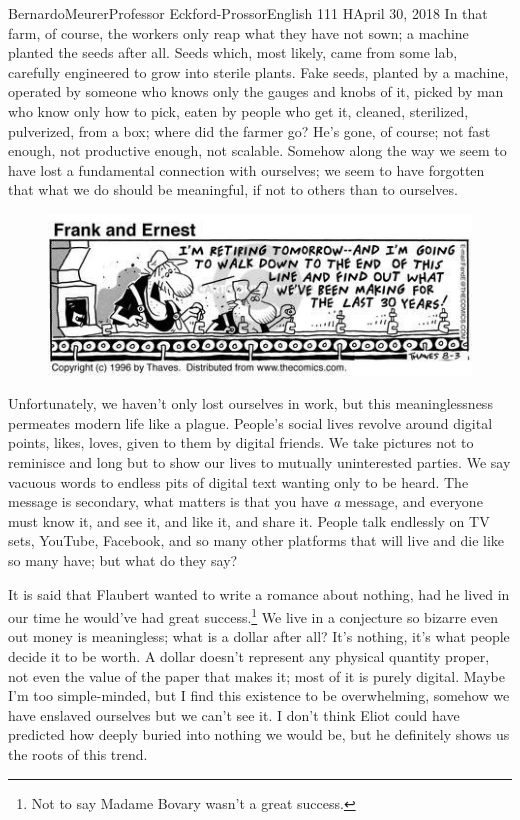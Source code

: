 \documentclass[12pt,letterpaper]{article}
\begin{document}
\begin{mla}{Bernardo}{Meurer}{Professor Eckford-Prossor}{English 111 H}{April 30, 2018}
	In that farm, of course, the workers only reap what they have not sown; a machine planted the seeds after all. Seeds which, most likely, came from some lab, carefully engineered to grow into sterile plants. Fake seeds, planted by a machine, operated by someone who knows only the gauges and knobs of it, picked by man who know only how to pick, eaten by people who get it, cleaned, sterilized, pulverized, from a box; where did the farmer go? He's gone, of course; not fast enough, not productive enough, not scalable. Somehow along the way we seem to have lost a fundamental connection with ourselves; we seem to have forgotten that what we do should be meaningful, if not to others than to ourselves.

	\begin{figure}[H]
		\centering
		\includegraphics{assembly.jpg}
	\end{figure}
	Unfortunately, we haven't only lost ourselves in work, but this meaninglessness permeates modern life like a plague. People's social lives revolve around digital points, likes, loves, given to them by digital friends. We take pictures not to reminisce and long but to show our lives to mutually uninterested parties. We say vacuous words to endless pits of digital text wanting only to be heard. The message is secondary, what matters is that you have \textit{a} message, and everyone must know it, and see it, and like it, and share it. People talk endlessly on TV sets, YouTube, Facebook, and so many other platforms that will live and die like so many have; but what do they say?

	It is said that Flaubert wanted to write a romance about nothing, had he lived in our time he would've had great success.\footnote{Not to say Madame Bovary wasn't a great success.} We live in a conjecture so bizarre even out money is meaningless; what is a dollar after all? It's nothing, it's what people decide it to be worth. A dollar doesn't represent any physical quantity proper, not even the value of the paper that makes it; most of it is purely digital. Maybe I'm too simple-minded, but I find this existence to be overwhelming, somehow we have enslaved ourselves but we can't see it. I don't think Eliot could have predicted how deeply buried into nothing we would be, but he definitely shows us the roots of this trend.


\end{mla}
\end{document}
